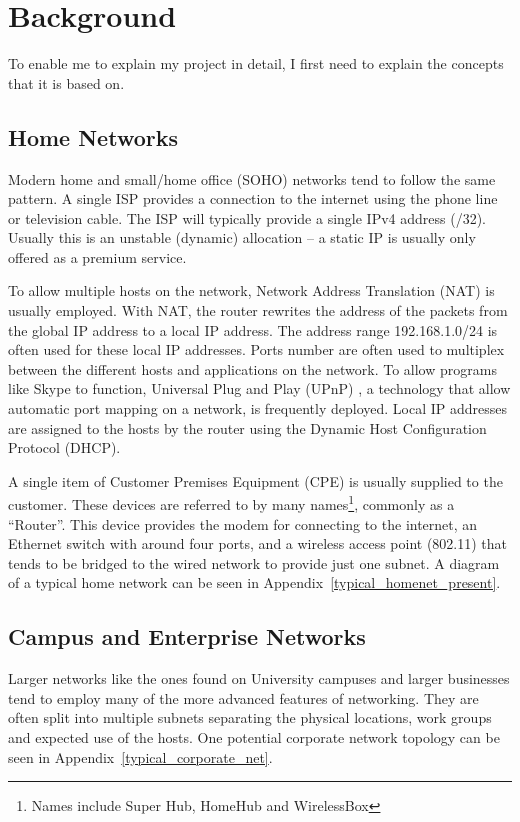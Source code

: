 \documentclass[12pt]{report}
\begin{document}
\chapter{Background}
To enable me to explain my project in detail, I first need to explain the
concepts that it is based on.

\section{Home Networks}
Modern home and small/home office (SOHO)  networks tend to follow the same pattern. A single ISP provides a
connection to the internet using the phone line or television cable.  The ISP
will typically provide a single IPv4 address (/32). Usually this is an unstable
(dynamic) allocation -- a static IP is usually only offered as a premium service. 

To allow multiple hosts on the network, Network Address Translation (NAT)
 is usually employed. With NAT,
the router rewrites the address of the packets from the global IP address to a
local IP address. The address range 192.168.1.0/24 is often used for these
local IP addresses. Ports number are often used to multiplex between the
different hosts and applications on the network. To allow programs like Skype
to function, Universal Plug and Play (UPnP) , a technology that allow automatic port mapping on a network, is
frequently deployed. Local IP addresses are assigned to the hosts by the router
using the Dynamic Host Configuration Protocol (DHCP). 

A single item of Customer Premises Equipment (CPE)  is usually supplied to the customer. These devices are
referred to by many names\footnote{Names include Super Hub, HomeHub and
WirelessBox}, commonly as a ``Router''.  This device provides the modem for
connecting to the internet, an Ethernet switch with around four ports, and a
wireless access point (802.11) that tends to be bridged to the wired network to
provide just one subnet. A diagram of a typical home network can be seen in
Appendix~\ref{typical_homenet_present}.

\section{Campus and Enterprise Networks}
Larger networks like the ones found on University campuses and larger
businesses tend to employ many of the more advanced features of networking.
They are often split into multiple subnets separating the physical locations,
work groups and expected use of the hosts. One potential corporate network
topology can be seen in Appendix~\ref{typical_corporate_net}.
\end{document}

